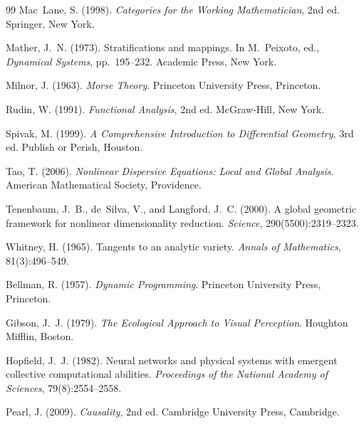 \documentclass[12pt, oneside]{book}
\theoremstyle{flyxion}
\theoremstyle{definition}
\begin{document}
\begin{thebibliography}{99}
Mac~Lane, S. (1998).
\newblock \textit{Categories for the Working Mathematician}, 2nd ed.
\newblock Springer, New York.

Mather, J.~N. (1973).
\newblock Stratifications and mappings.
\newblock In M.~Peixoto, ed., \textit{Dynamical Systems}, pp.\ 195--232.
\newblock Academic Press, New York.

Milnor, J. (1963).
\newblock \textit{Morse Theory}.
\newblock Princeton University Press, Princeton.

Rudin, W. (1991).
\newblock \textit{Functional Analysis}, 2nd ed.
\newblock McGraw-Hill, New York.

Spivak, M. (1999).
\newblock \textit{A Comprehensive Introduction to Differential Geometry},
  3rd ed.
\newblock Publish or Perish, Houston.

Tao, T. (2006).
\newblock \textit{Nonlinear Dispersive Equations: Local and Global Analysis}.
\newblock American Mathematical Society, Providence.

Tenenbaum, J.~B., de~Silva, V., and Langford, J.~C. (2000).
\newblock A global geometric framework for nonlinear dimensionality reduction.
\newblock \textit{Science}, 290(5500):2319--2323.

Whitney, H. (1965).
\newblock Tangents to an analytic variety.
\newblock \textit{Annals of Mathematics}, 81(3):496--549.


Bellman, R. (1957).
\newblock \textit{Dynamic Programming}.
\newblock Princeton University Press, Princeton.

Gibson, J.~J. (1979).
\newblock \textit{The Ecological Approach to Visual Perception}.
\newblock Houghton Mifflin, Boston.

Hopfield, J.~J. (1982).
\newblock Neural networks and physical systems with emergent collective
  computational abilities.
\newblock \textit{Proceedings of the National Academy of Sciences},
  79(8):2554--2558.

Pearl, J. (2009).
\newblock \textit{Causality}, 2nd ed.
\newblock Cambridge University Press, Cambridge.


\end{thebibliography}
\end{document}
